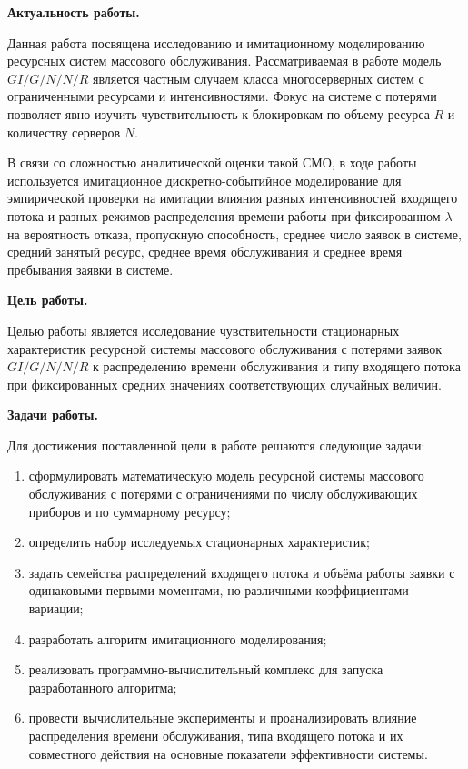 \textbf{Актуальность работы.}

Данная работа посвящена исследованию и имитационному моделированию ресурсных систем массового обслуживания. Рассматриваемая в работе модель $GI/G/N/N/R$ является частным случаем класса многосерверных систем с ограниченными ресурсами и интенсивностями. Фокус на системе с потерями позволяет явно изучить чувствительность к блокировкам по объему ресурса $R$ и количеству серверов $N$. 

В связи со сложностью аналитической оценки такой СМО, в ходе работы используется имитационное дискретно-событийное моделирование для эмпирической проверки на имитации влияния разных интенсивностей входящего потока и разных режимов распределения времени работы при фиксированном $\lambda$ на вероятность отказа, пропускную способность, среднее число заявок в системе, средний занятый ресурс, среднее время обслуживания и среднее время пребывания заявки в системе.

\textbf{Цель работы.} 

Целью работы является исследование чувствительности стационарных характеристик ресурсной системы массового обслуживания с потерями заявок $GI/G/N/N/R$ к распределению времени обслуживания и типу входящего потока при фиксированных средних значениях соответствующих случайных величин.

\textbf{Задачи работы.}

Для достижения поставленной цели в работе решаются следующие задачи: \begin{enumerate} 
    \item сформулировать математическую модель ресурсной системы массового обслуживания с потерями с ограничениями по числу обслуживающих приборов и по суммарному ресурсу; 
    \item определить набор исследуемых стационарных характеристик; 
    \item задать семейства распределений входящего потока и объёма работы заявки с одинаковыми первыми моментами, но различными коэффициентами вариации; 
    \item разработать алгоритм имитационного моделирования; 
    \item реализовать программно-вычислительный комплекс для запуска разработанного алгоритма; 
    \item провести вычислительные эксперименты и проанализировать влияние распределения времени обслуживания, типа входящего потока и их совместного действия на основные показатели эффективности системы. 
\end{enumerate}

